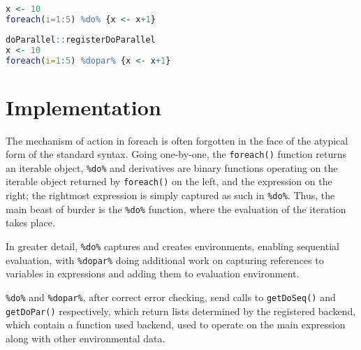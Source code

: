 \documentclass[a4paper,10pt]{article}
\begin{document}
\begin{lstlisting}[float,language=R,caption={Serial Iteration},label=lst:serial]
x <- 10
foreach(i=1:5) %do% {x <- x+1}
\end{lstlisting}
\begin{lstlisting}[float,language=R,caption={Parallel Iteration},label=lst:parallel]
doParallel::registerDoParallel
x <- 10
foreach(i=1:5) %dopar% {x <- x+1}
\end{lstlisting}

\section{Implementation}
\label{sec:implementation}

The mechanism of action in foreach is often forgotten in the face of
the atypical form of the standard syntax. Going one-by-one, the
\texttt{foreach()} function returns an iterable object,
\texttt{\%do\%} and derivatives are binary functions operating on the
iterable object returned by \texttt{foreach()} on the left, and the
expression on the right; the rightmost expression is simply captured
as such in \texttt{\%do\%}. Thus, the main beast of burder is the
\texttt{\%do\%} function, where the evaluation of the iteration takes
place.

In greater detail, \texttt{\%do\%} captures and creates environments,
enabling sequential evaluation, with \texttt{\%dopar\%} doing
additional work on capturing references to variables in expressions
and adding them to evaluation environment.

\texttt{\%do\%} and \texttt{\%dopar\%}, after correct error checking,
send calls to \texttt{getDoSeq()} and \texttt{getDoPar()}
respectively, which return lists determined by the registered backend,
which contain a function used backend, used to operate on the main
expression along with other environmental data.
\end{document}
